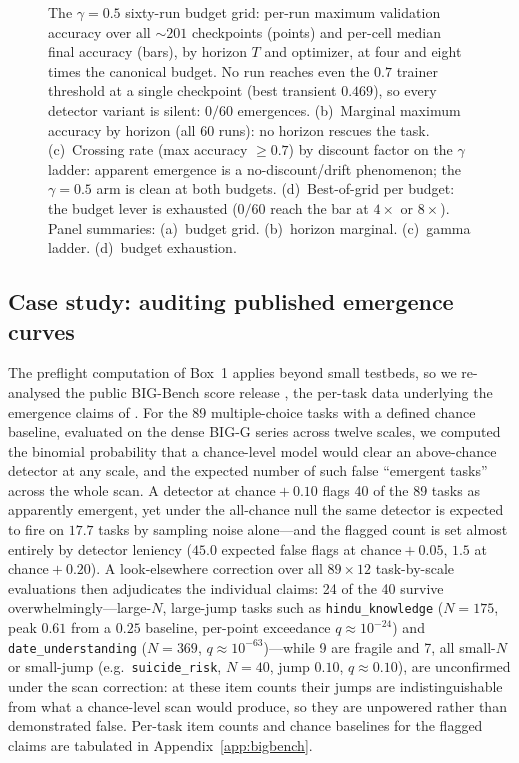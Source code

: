 \documentclass[11pt]{article}
\theoremstyle{plain}
\theoremstyle{definition}
\begin{document}
\begin{figure}[htbp]
\centering
{}
\caption{The $\gamma=0.5$ sixty-run budget grid: per-run maximum validation
accuracy over all ${\sim}201$ checkpoints (points) and per-cell median final
accuracy (bars), by horizon $T$ and optimizer, at four and eight times the
canonical budget. No run reaches even the $0.7$ trainer threshold at a single
checkpoint (best transient $0.469$), so every detector variant is silent:
$0/60$ emergences.
(b)~Marginal maximum accuracy by horizon (all 60 runs): no horizon rescues
the task.
(c)~Crossing rate (max accuracy ${\geq}0.7$) by discount factor on the
$\gamma$ ladder: apparent emergence is a no-discount/drift phenomenon; the
$\gamma=0.5$ arm is clean at both budgets.
(d)~Best-of-grid per budget: the budget lever is exhausted ($0/60$ reach the
bar at $4\times$ or $8\times$).
Panel summaries: (a)~budget grid. (b)~horizon marginal. (c)~gamma ladder. (d)~budget exhaustion.}
\label{fig:budgetgrid}
\end{figure}

\subsection{Case study: auditing published emergence curves}\label{sec:bigbench}

The preflight computation of Box~1 applies beyond small testbeds, so we re-analysed the
public BIG-Bench score release \citep{srivastava2022bigbench}, the per-task data
underlying the emergence claims of \citet{wei2022emergent}. For the 89 multiple-choice
tasks with a defined chance baseline, evaluated on the dense BIG-G series across twelve
scales, we computed the binomial probability that a chance-level model would clear an
above-chance detector at any scale, and the expected number of such false ``emergent
tasks'' across the whole scan. A detector at chance${}+0.10$ flags 40 of the 89 tasks as
apparently emergent, yet under the all-chance null the same detector is expected to fire
on $17.7$ tasks by sampling noise alone---and the flagged count is set almost entirely
by detector leniency ($45.0$ expected false flags at chance${}+0.05$, $1.5$ at
chance${}+0.20$). A look-elsewhere correction over all $89\times12$ task-by-scale
evaluations then adjudicates the individual claims: 24 of the 40 survive
overwhelmingly---large-$N$, large-jump tasks such as \texttt{hindu\_knowledge} ($N{=}175$,
peak $0.61$ from a $0.25$ baseline, per-point exceedance $q\approx10^{-24}$) and
\texttt{date\_understanding} ($N{=}369$, $q\approx10^{-63}$)---while 9 are fragile and 7,
all small-$N$ or small-jump (e.g.\ \texttt{suicide\_risk}, $N{=}40$, jump $0.10$,
$q\approx0.10$), are unconfirmed under the scan correction: at these item counts their
jumps are indistinguishable from what a chance-level scan would produce, so they are
unpowered rather than demonstrated false. Per-task item counts and chance baselines for
the flagged claims are tabulated in Appendix~\ref{app:bigbench}.
\end{document}
